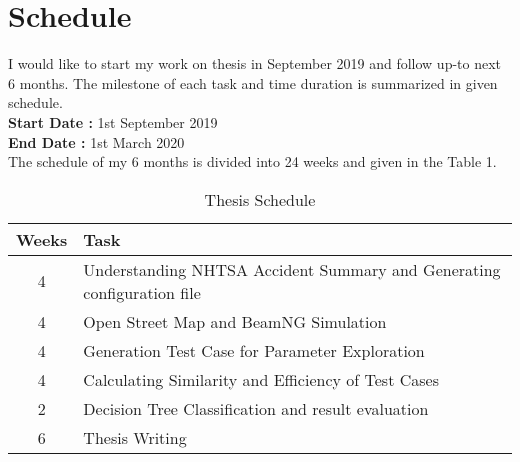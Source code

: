\section{Schedule}

I would like to start my work on thesis in September 2019 and follow up-to next 6 months. The milestone of each task and time duration is summarized in given schedule. \\

\textbf{Start Date : }  1st September 2019 \\ 
\textbf{End Date   : }  1st March 2020 \\

The schedule of my 6 months is divided into 24 weeks and given in the Table 1.



\begin{table}[h!tp]
\centering
\caption{Thesis Schedule} 
\medskip
\begin{tabular}{c l}
\toprule
\bfseries Weeks & \bfseries Task \\
\midrule
4 & Understanding NHTSA Accident Summary and Generating configuration file  \\
4 & Open Street Map and BeamNG Simulation \\
4 & Generation Test Case for Parameter Exploration \\
4 & Calculating Similarity and Efficiency of Test Cases \\
2 & Decision Tree Classification and result evaluation \\
6 & Thesis Writing \\
\bottomrule
\end{tabular}
\label{table:schedule}
\end{table}